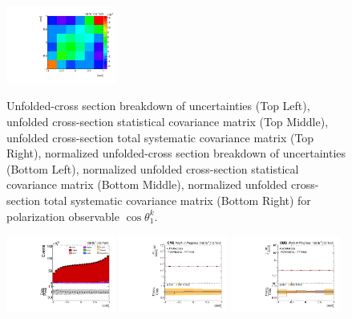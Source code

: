 \begin{refsection}
\begin{figure}[htb]
\begin{center}
 \includegraphics[width=0.32\textwidth]{fig_fullRun2UL/unfolding/combined/TotalSystCovMatrixNorm_rebinnedB_b1k.pdf} \\
\caption{Unfolded-cross section breakdown of uncertainties (Top Left), unfolded cross-section statistical covariance matrix (Top Middle), unfolded cross-section total systematic covariance matrix (Top Right), normalized unfolded-cross section breakdown of uncertainties (Bottom Left), normalized unfolded cross-section statistical covariance matrix (Bottom Middle), normalized unfolded cross-section total systematic covariance matrix (Bottom Right) for polarization observable $\cos\theta_{1}^{k}$.}
\label{fig:b1k_uncertainties}
\end{center}
\end{figure}
\clearpage
\begin{figure}[htb]
\begin{center}
 \includegraphics[width=0.32\textwidth]{fig_fullRun2UL/controlplots/combined/Hyp_LeptonBk.pdf}
 \includegraphics[width=0.32\textwidth]{fig_fullRun2UL/unfolding/combined/UnfoldedResults_b2k.pdf}
 \includegraphics[width=0.32\textwidth]{fig_fullRun2UL/unfolding/combined/UnfoldedResultsNorm_b2k.pdf} \\

\end{center}
\end{figure}
\end{refsection}
